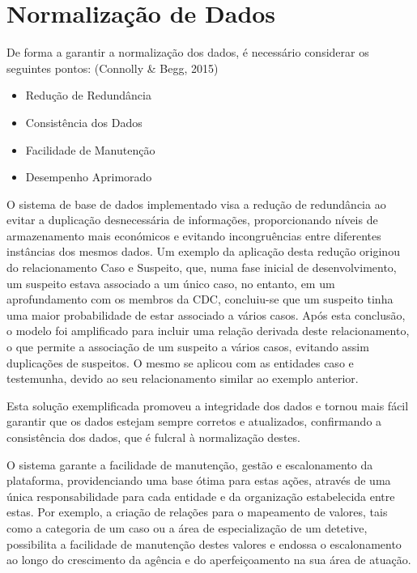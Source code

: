 \documentclass[a4paper,12pt]{scrreprt}
\begin{document}

    \clearpage
    \section{Normalização de Dados}
        De forma a garantir a normalização dos dados, é necessário considerar os seguintes pontos: \cite{DatabaseSystems} (Connolly \& Begg, 2015)
        \begin{itemize}
            \item Redução de Redundância
            \item Consistência dos Dados
            \item Facilidade de Manutenção
            \item Desempenho Aprimorado
        \end{itemize}
        O sistema de base de dados implementado visa a redução de redundância ao evitar a duplicação desnecessária de informações, proporcionando níveis de armazenamento mais económicos e evitando incongruências entre diferentes instâncias dos mesmos dados. Um exemplo da aplicação desta redução originou do relacionamento Caso e Suspeito, que, numa fase inicial de desenvolvimento, um suspeito estava associado a um único caso, no entanto, em um aprofundamento com os membros da CDC, concluiu-se que um suspeito tinha uma maior probabilidade de estar associado a vários casos. Após esta conclusão, o modelo foi amplificado para incluir uma relação derivada deste relacionamento, o que permite a associação de um suspeito a vários casos, evitando assim duplicações de suspeitos. O mesmo se aplicou com as entidades caso e testemunha, devido ao seu relacionamento similar ao exemplo anterior.

        Esta solução exemplificada promoveu a integridade dos dados e tornou mais fácil garantir que os dados estejam sempre corretos e atualizados, confirmando a consistência dos dados, que é fulcral à normalização destes.

        O sistema garante a facilidade de manutenção, gestão e escalonamento da plataforma, providenciando uma base ótima para estas ações, através de uma única responsabilidade para cada entidade e da organização estabelecida entre estas. Por exemplo, a criação de relações para o mapeamento de valores, tais como a categoria de um caso ou a área de especialização de um detetive, possibilita a facilidade de manutenção destes valores e endossa o escalonamento ao longo do crescimento da agência e do aperfeiçoamento na sua área de atuação.
\end{document}
